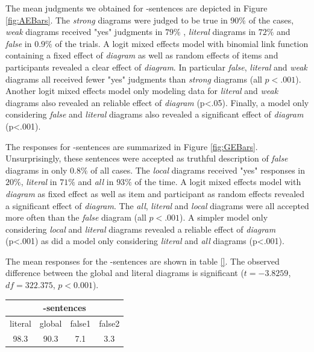 \documentclass[fleqn,reqno,10pt,draft]{article}
\newcommand{\as}{\acro{as}}
\renewcommand{\es}{\acro{es}}
\newcommand{\ea}{\acro{ea}}
\begin{document}
The mean judgments we obtained for \as-sentences are depicted in Figure \ref{fig:AEBars}. The {\it strong} diagrams were judged to be true in $90\%$ of the cases, {\it weak} diagrams received "yes" judgments in $79\%$ , {\it literal} diagrams in  $72\%$  and {\it false} in $0.9\%$ of the trials.  A logit mixed effects model with binomial link function containing a fixed effect of {\it diagram} as well as random effects of items and participants revealed a clear effect of {\it diagram}. In particular {\it false}, {\it literal} and {\it weak} diagrams all received fewer "yes" judgments than {\it strong} diagrams (all $p<.001$).  Another logit mixed effects model only modeling data for {\it literal} and {\it weak} diagrams also revealed an reliable effect of {\it diagram} (p<.05). Finally, a model only considering  {\it false} and {\it literal} diagrams also revealed a significant effect of {\it diagram} (p<.001).

% 
%
%  



The responses for \es-sentences are summarized in Figure \ref{fig:GEBars}. Unsurprisingly, these sentences were accepted as truthful description of {\it false} diagrams in only $0.8\%$ of all cases. The {\it local} diagrams received  "yes" responses in $20\%$, {\it literal} in $71\%$ and {\it all} in $93\%$ of the time. A logit mixed effects model with {\it diagram} as fixed effect as well as item and participant as random effects revealed a significant effect of {\it diagram}. The {\it all}, {\it literal} and {\it local} diagrams were all accepted more often than the {\it false} diagram (all $p<.001$). A simpler model only considering {\it local} and {\it literal} diagrams revealed a reliable effect of {\it diagram} (p<.001) as did a model only considering {\it literal} and {\it all} diagrams (p<.001).

The mean responses for the \ea-sentences are shown in table \ref{}. The observed difference between the global and literal diagrams is
significant ($t = -3.8259$, $df = 322.375$, $p < 0.001$).

\begin{center}
  \begin{tabular}{cccc}
    \multicolumn{4}{c}{\as-sentences}  \\
    \hline
    literal & global & false1 & false2
    \\ \midrule 
    98.3 & 90.3 & 7.1 & 3.3 
  \end{tabular}
\end{center}
\end{document}
